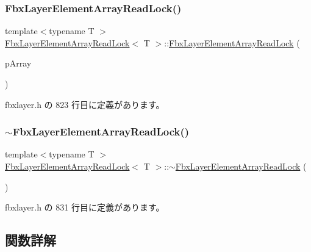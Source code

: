 \subsubsection{\texorpdfstring{Fbx\+Layer\+Element\+Array\+Read\+Lock()}{FbxLayerElementArrayReadLock()}}
{\footnotesize\ttfamily template$<$typename T $>$ \\
\hyperlink{struct_fbx_layer_element_array_read_lock}{Fbx\+Layer\+Element\+Array\+Read\+Lock}$<$ T $>$\+::\hyperlink{struct_fbx_layer_element_array_read_lock}{Fbx\+Layer\+Element\+Array\+Read\+Lock} (\begin{DoxyParamCaption}\item[{\hyperlink{class_fbx_layer_element_array}{Fbx\+Layer\+Element\+Array} \&}]{p\+Array }\end{DoxyParamCaption})\hspace{0.3cm}{\ttfamily [inline]}}



 fbxlayer.\+h の 823 行目に定義があります。

\mbox{\label{struct_fbx_layer_element_array_read_lock_ab1e67ef56df73649cc41c66f88b29116}} 
\subsubsection{\texorpdfstring{$\sim$\+Fbx\+Layer\+Element\+Array\+Read\+Lock()}{~FbxLayerElementArrayReadLock()}}
{\footnotesize\ttfamily template$<$typename T $>$ \\
\hyperlink{struct_fbx_layer_element_array_read_lock}{Fbx\+Layer\+Element\+Array\+Read\+Lock}$<$ T $>$\+::$\sim$\hyperlink{struct_fbx_layer_element_array_read_lock}{Fbx\+Layer\+Element\+Array\+Read\+Lock} (\begin{DoxyParamCaption}{ }\end{DoxyParamCaption})\hspace{0.3cm}{\ttfamily [inline]}}



 fbxlayer.\+h の 831 行目に定義があります。



\subsection{関数詳解}
\mbox{\label{struct_fbx_layer_element_array_read_lock_aad710280b9db22c282672ab5d193169d}} 
